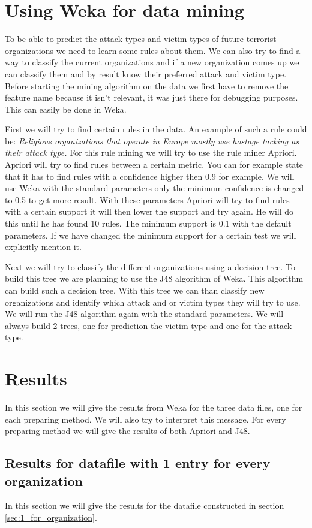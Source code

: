 \documentclass[a4]{article}
\begin{document}
\section{Using Weka for data mining}
\label{sec:weka}
To be able to predict the attack types and victim types of future terrorist organizations we need to learn some rules about them. We can also try to find a way to classify the current organizations and if a new organization comes up we can classify them and by result know their preferred attack and victim type. Before starting the mining algorithm on the data we first have to remove the feature name because it isn't relevant, it was just there for debugging purposes. This can easily be done in Weka.\par
First we will try to find certain rules in the data. An example of such a rule could be: \textit{Religious organizations that operate in Europe mostly use hostage tacking as their attack type.} For this rule mining we will try to use the rule miner Apriori. Apriori will try to find rules between a certain metric. You can for example state that it has to find rules with a confidence higher then 0.9 for example. We will use Weka with the standard parameters only the minimum confidence is changed to 0.5 to get more result. With these parameters Apriori will try to find rules with a certain support it will then lower the support and try again. He will do this until he has found 10 rules. The minimum support is 0.1 with the default parameters. If we have changed the minimum support for a certain test we will explicitly mention it.\par
Next we will try to classify the different organizations using a decision tree. To build this tree we are planning to use the J48 algorithm of Weka. This algorithm can build such a decision tree. With this tree we can than classify new organizations and identify which attack and or victim types they will try to use. We will run the J48 algorithm again with the standard parameters. We will always build 2 trees, one for prediction the victim type and one for the attack type.\par
\section{Results}
\label{sec:results}
In this section we will give the results from Weka for the three data files, one for each preparing method. We will also try to interpret this message. For every preparing method we will give the results of both Apriori and J48.
\subsection{Results for datafile with 1 entry for every organization}
In this section we will give the results for the datafile constructed in section \ref{sec:1_for_organization}.
\end{document}
